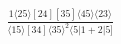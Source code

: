 \documentclass[varwidth, border=5pt]{standalone}
\begin{document}
\begin{my}
$\begin{gathered}
\scriptscriptstyle\frac{1⟨25⟩[24][35]⟨45⟩⟨23⟩}{⟨15⟩[34]⟨35⟩^2⟨5|1+2|5]}
\end{gathered}$
\end{my}
\end{document}
